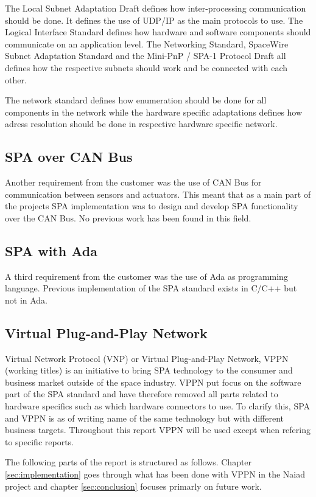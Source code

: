 The Local Subnet Adaptation Draft defines how inter-processing communication
should be done. It defines the use of UDP/IP as the main protocols to use. The
Logical Interface Standard defines how hardware and software components should
communicate on an application level. The Networking Standard, SpaceWire Subnet
Adaptation Standard and the Mini-PnP / SPA-1 Protocol Draft all defines how the
respective subnets should work and be connected with each other.

The network
standard defines how enumeration should be done for all components in
the network while the hardware specific adaptations defines how adress
resolution should be done in respective hardware specific network.

\subsection{SPA over CAN Bus}
Another requirement from the customer was the use of CAN Bus
\cite{standard:can_bus} for communication between sensors and actuators.
This meant that as a main part of the projects
SPA implementation was to design and develop SPA functionality over the CAN
Bus. No previous work has been found in this field.

\subsection{SPA with Ada}
A third requirement from the customer was the use of Ada as programming
language. Previous implementation of the SPA standard exists in C/C++ but not
in Ada.

\subsection{Virtual Plug-and-Play Network}
Virtual Network Protocol (VNP) \cite{web:vnp} or Virtual Plug-and-Play
Network, VPPN (working titles) is an initiative to bring SPA technology to
the consumer and business market outside of the space industry. VPPN put focus
on the software part of the SPA standard and have therefore removed all parts
related to hardware specifics such as which hardware connectors to use. To
clarify this, SPA and VPPN is as of writing name of the same technology but
with different business targets. Throughout this report VPPN will be used
except when refering to specific reports.

The following parts of the report is structured as follows. Chapter \ref{sec:implementation}
goes through what has been done with VPPN in the Naiad project and chapter
\ref{sec:conclusion} focuses primarly on future work.
